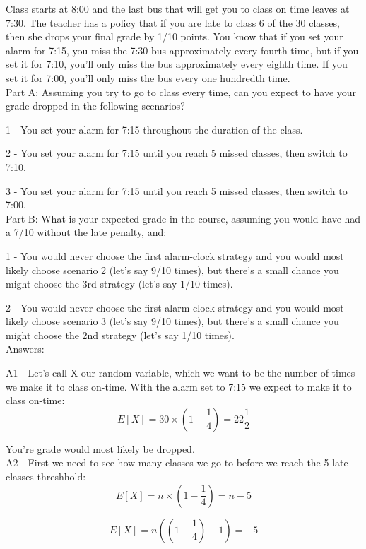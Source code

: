 \documentclass[12pt,a4paper]{article}
\theoremstyle{regla}
\theoremstyle{remark}
\theoremstyle{definition}
\theoremstyle{nonumberbreak}
\begin{document}
\begin{xmpl}

Class starts at 8:00 and the last bus that will get you to class on time leaves at 7:30. The teacher has a policy that if you are late to class 6 of the 30 classes, then she drops your final grade by 1/10 points. You know that if you set your alarm for 7:15, you miss the 7:30 bus approximately every fourth time, but if you set it for 7:10, you'll only miss the bus approximately every eighth time. If you set it for 7:00, you'll only miss the bus every one hundredth time.\\

Part A: Assuming you try to go to class every time, can you expect to have your grade dropped in the following scenarios?

1 - You set your alarm for 7:15 throughout the duration of the class.

2 - You set your alarm for 7:15 until you reach 5 missed classes, then switch to 7:10.

3 - You set your alarm for 7:15 until you reach 5 missed classes, then switch to 7:00.\\

Part B: What is your expected grade in the course, assuming you would have had a 7/10 without the late penalty, and:

1 - You would never choose the first alarm-clock strategy and you would most likely choose scenario 2 (let's say 9/10 times), but there's a small chance you might choose the 3rd strategy (let's say 1/10 times).

2 - You would never choose the first alarm-clock strategy and you would most likely choose scenario 3 (let's say 9/10 times), but there's a small chance you might choose the 2nd strategy (let's say 1/10 times).\\

Answers:

A1 - Let's call X our random variable, which we want to be the number of times we make it to class on-time. With the alarm set to 7:15 we expect to make it to class on-time:
$$E[X]=30\times(1-\frac{1}{4})=22\frac{1}{2}$$

You're grade would most likely be dropped.\\

A2 - First we need to see how many classes we go to before we reach the 5-late-classes threshhold:
$$E[X] = n \times (1 - \frac{1}{4}) = n - 5 $$

$$E[X] = n ((1 - \frac{1}{4}) - 1) = - 5 $$


\end{xmpl}
\end{document}
